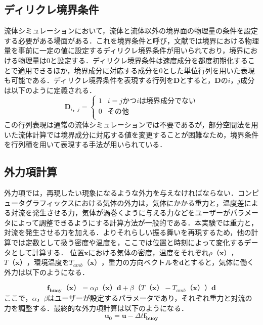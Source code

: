 \documentclass[a4j,12pt]{jreport}
\begin{document}
\subsection{ディリクレ境界条件}
流体シミュレーションにおいて，流体と流体以外の境界面の物理量の条件を設定する必要がある場面がある．これを境界条件と呼び，文献\cite{fedkiw}では境界における物理量を事前に一定の値に設定するディリクレ境界条件が用いられており，境界における物理量は$0$と設定する．ディリクレ境界条件は速度成分を都度初期化することで適用できるほか，境界成分に対応する成分を0とした単位行列を用いた表現も可能である．ディリクレ境界条件を表現する行列を$\mathbf{D}$とすると，$\mathbf{D}$の$i，j$成分は以下のように定義される．
\begin{equation}
	\mathbf{D}_{i，j} = \begin{cases}
 	1 	& i = j かつ iは境界成分でない\\
 	0  		& その他\\
 \end{cases}
\end{equation}
この行列表現は通常の流体シミュレーションでは不要であるが，部分空間法を用いた流体計算では境界成分に対応する値を変更することが困難なため，境界条件を行列積を用いて表現する手法が用いられている．

\subsection{外力項計算}
外力項では，再現したい現象になるような外力を与えなければならない．コンピュータグラフィックスにおける気体の外力は，気体にかかる重力と，温度差による対流を発生させる力，気体が渦巻くように与える力などをユーザーがパラメータによって調整できるようにする計算方法が一般的である．本実験では重力と，対流を発生させる力を加える．よりそれらしい振る舞いを再現するため，他の計算では定数として扱う密度や温度を，ここでは位置と時刻によって変化するデータとして計算する．
位置$\bm{x}$における気体の密度，温度をそれぞれ$\rho（\bm{x}）$，$T（\bm{x}）$，環境温度を$T_{amb}（\bm{x}）$，重力の方向ベクトルを$\bm{d}$とすると，気体に働く外力は以下のようになる．

\begin{equation}\label{eq:buoyancy}
	\bm{f_{buoy}（\bm{x}）} =  \alpha \rho（\bm{x}）\bm{d}+ \beta（T（\bm{x}）- T_{amb}（\bm{x}））\bm{d}
\end{equation} 
ここで，$\alpha$，$\beta$はユーザーが設定するパラメータであり，それぞれ重力と対流の力を調整する．最終的な外力項計算は以下のようになる．
\begin{equation}
	\bm{u_0} =  \bm{u}  - \varDelta t \bm{f_{buoy}} 
\end{equation} 
\end{document}
